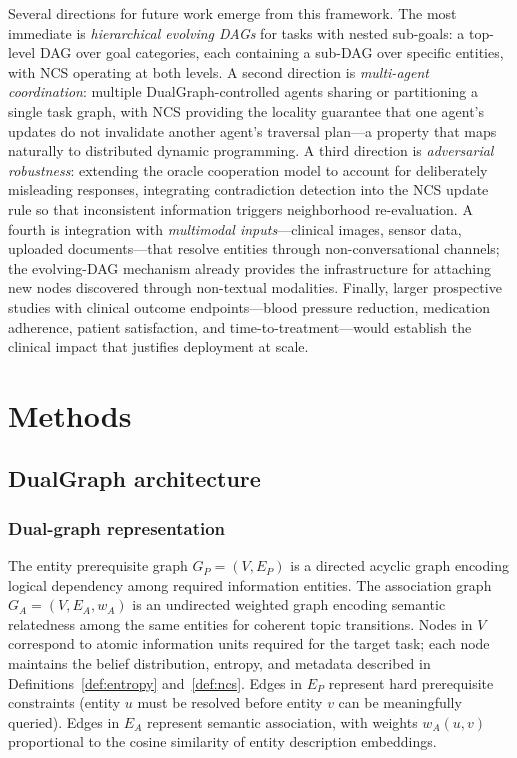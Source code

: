 \documentclass[11pt,a4paper]{article}
\begin{document}
Several directions for future work emerge from this framework. The most
immediate is \emph{hierarchical evolving DAGs} for tasks with nested
sub-goals: a top-level DAG over goal categories, each containing a
sub-DAG over specific entities, with NCS operating at both levels.
A second direction is \emph{multi-agent coordination}: multiple
DualGraph-controlled agents sharing or partitioning a single task graph,
with NCS providing the locality guarantee that one agent's updates do not
invalidate another agent's traversal plan---a property that maps naturally
to distributed dynamic programming.
A third direction is \emph{adversarial robustness}: extending the oracle
cooperation model to account for deliberately misleading responses,
integrating contradiction detection into the NCS update rule so that
inconsistent information triggers neighborhood re-evaluation.
A fourth is integration with \emph{multimodal inputs}---clinical images,
sensor data, uploaded documents---that resolve entities through
non-conversational channels; the evolving-DAG mechanism already provides
the infrastructure for attaching new nodes discovered through non-textual
modalities.
Finally, larger prospective studies with clinical outcome endpoints---blood
pressure reduction, medication adherence, patient satisfaction, and
time-to-treatment---would establish the clinical impact that justifies
deployment at scale.

\section{Methods}
\label{sec:methods}

\subsection{DualGraph architecture}
\label{sec:methods_architecture}

\subsubsection{Dual-graph representation}

The entity prerequisite graph $G_P = (V, E_P)$ is a directed acyclic graph
encoding logical dependency among required information entities. The
association graph $G_A = (V, E_A, w_A)$ is an undirected weighted graph
encoding semantic relatedness among the same entities for coherent topic
transitions. Nodes in $V$ correspond to atomic information units required for
the target task; each node maintains the belief distribution, entropy, and
metadata described in Definitions~\ref{def:entropy} and~\ref{def:ncs}. Edges
in $E_P$ represent hard prerequisite constraints (entity $u$ must be resolved
before entity $v$ can be meaningfully queried). Edges in $E_A$ represent
semantic association, with weights $w_A(u, v)$ proportional to the cosine
similarity of entity description embeddings.
\end{document}
